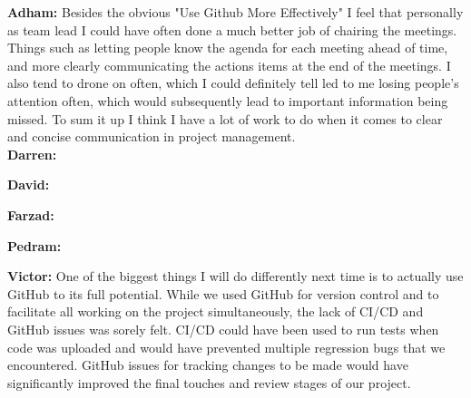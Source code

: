 \documentclass{article}
\begin{document}
\textbf{Adham:} Besides the obvious "Use Github More Effectively" I feel that personally as team lead I could have often done a much better job of chairing the meetings. Things
such as letting people know the agenda for each meeting ahead of time, and more clearly communicating the actions items at the end of the meetings. I also tend to drone on 
often, which I could definitely tell led to me losing people's attention often, which would subsequently lead to important information being missed. To sum it up I think I have
a lot of work to do when it comes to clear and concise communication in project management.\\
\textbf{Darren:}

\textbf{David:}

\textbf{Farzad:}

\textbf{Pedram:}

\textbf{Victor:} One of the biggest things I will do differently next time is to actually use GitHub to its full potential. While we used GitHub for version control and to 
facilitate all working on the project simultaneously, the lack of CI/CD and GitHub issues was sorely felt. CI/CD could have been used to run tests when code was uploaded and 
would have prevented multiple regression bugs that we encountered. GitHub issues for tracking changes to be made would have significantly improved the final touches and review 
stages of our project.
\end{document}
